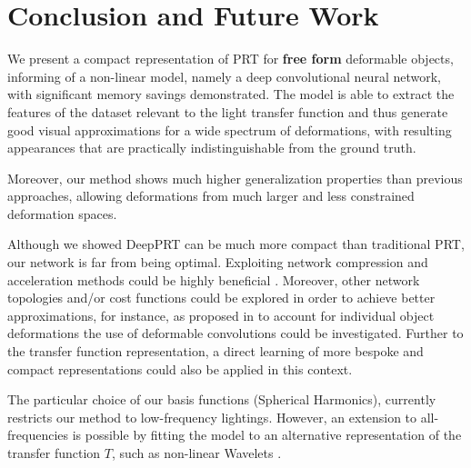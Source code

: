 \section{Conclusion and Future Work}
We present a compact representation of PRT for \textbf{free form} deformable objects, informing of a non-linear model, namely a deep convolutional neural network, with significant memory savings demonstrated.
 The model is able to extract the features of the dataset relevant to the light transfer function and thus generate good visual approximations for a wide spectrum of deformations, with resulting appearances that are practically indistinguishable from the ground truth.  

Moreover, our method shows much higher generalization properties than previous approaches, allowing deformations from much larger and less constrained deformation spaces.

Although we showed DeepPRT can be much more compact than traditional PRT, our network is far from being optimal. Exploiting network compression and acceleration methods could be highly beneficial \cite{Survey_NN_Compression, Deep_Compression}.
Moreover, other network topologies and/or cost functions could be explored in order to achieve better approximations, for instance, as proposed in \cite{Deformable_UNet} to account for individual object deformations the use of deformable convolutions \cite{DeformableCNN} could be investigated. Further to the transfer function representation, a direct learning of more bespoke and compact representations \cite{Sloan2018} could also be applied in this context.

The particular choice of our basis functions (Spherical Harmonics), currently restricts our method to low-frequency lightings. However, an extension to all-frequencies is possible by fitting the model to an alternative representation of the transfer function $T$, such as non-linear Wavelets \cite{AllFrequencyPRT}.

